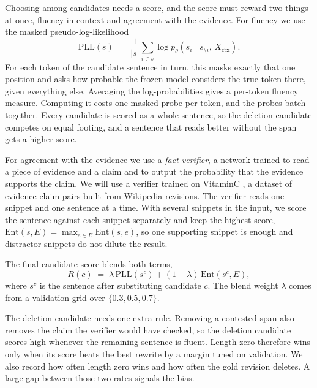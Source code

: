 \documentclass[]{paper}
\begin{document}
Choosing among candidates needs a score, and the score must reward two things at once, fluency in context and agreement with the evidence. For fluency we use the masked pseudo-log-likelihood
\begin{equation}
\mathrm{PLL}(s) \;=\; \frac{1}{|s|} \sum_{i \in s} \log p_\theta\!\left(s_i \mid s_{\setminus i},\, X_{\mathrm{ctx}}\right).
\label{eq:pll}
\end{equation}
For each token of the candidate sentence in turn, this masks exactly that one position and asks how probable the frozen model considers the true token there, given everything else. Averaging the log-probabilities gives a per-token fluency measure. Computing it costs one masked probe per token, and the probes batch together. Every candidate is scored as a whole sentence, so the deletion candidate competes on equal footing, and a sentence that reads better without the span gets a higher score.

For agreement with the evidence we use a \emph{fact verifier}, a network trained to read a piece of evidence and a claim and to output the probability that the evidence supports the claim. We will use a verifier trained on VitaminC \citep{schuster-etal-2021-vitaminc}, a dataset of evidence-claim pairs built from Wikipedia revisions. The verifier reads one snippet and one sentence at a time. With several snippets in the input, we score the sentence against each snippet separately and keep the highest score, $\mathrm{Ent}(s, E) = \max_{e \in E} \mathrm{Ent}(s, e)$, so one supporting snippet is enough and distractor snippets do not dilute the result.

The final candidate score blends both terms,
\begin{equation}
R(c) \;=\; \lambda\, \mathrm{PLL}(s^{c}) + (1 - \lambda)\, \mathrm{Ent}(s^{c}, E),
\label{eq:rerank}
\end{equation}
where $s^c$ is the sentence after substituting candidate $c$. The blend weight $\lambda$ comes from a validation grid over $\{0.3, 0.5, 0.7\}$.

The deletion candidate needs one extra rule. Removing a contested span also removes the claim the verifier would have checked, so the deletion candidate scores high whenever the remaining sentence is fluent. Length zero therefore wins only when its score beats the best rewrite by a margin tuned on validation. We also record how often length zero wins and how often the gold revision deletes. A large gap between those two rates signals the bias.
\end{document}
